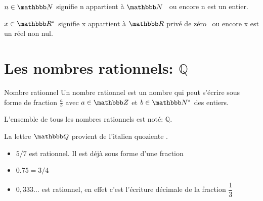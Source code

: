 \documentclass[10pt,a4paper,openany,twoside,prof]{book}
\begin{document}
\begin{ex}{}{}
	$n\in\N$ signifie \guillemotleft n appartient à $\N$ \guillemotright\ ou encore \guillemotleft n est un entier\guillemotright.

	$x\in\R^*$ signifie \guillemotleft x appartient à $\R$ privé de zéro \guillemotright\ ou encore \guillemotleft x est un réel non nul\guillemotright.
\end{ex}

\section{Les nombres rationnels: $\mathbb{Q}$}

\begin{defi}{Nombre rationnel}{}
Un nombre rationnel est un nombre qui peut s'écrire sous forme de fraction $\frac{a}{b}$ avec $a\in\Z$ et $b\in\N^*$ des entiers.

 L'ensemble de tous les nombres rationnels est noté: $\mathbb{Q}$.
\end{defi}

\begin{rem}{}{}
	La lettre $\Q$ provient de l'italien \guillemotleft quoziente \guillemotright.
\end{rem}

\begin{ex}{}{}
\begin{itemize}
	\item $5/7$ est rationnel. Il est déjà sous forme d'une fraction
	\item $0.75 = 3/4$
	\item  $0,333\dots$ est rationnel, en effet c'est l'écriture décimale de la fraction $\dfrac{1}{3}$
\end{itemize}
\end{ex}
\end{document}
